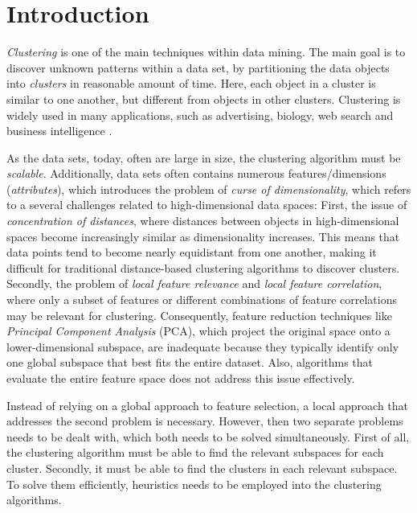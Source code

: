 \section{Introduction}
\textit{Clustering} is one of the main techniques within data mining. The main goal is to discover unknown patterns within a data set, by partitioning the data objects into \textit{clusters} in reasonable amount of time. Here, each object in a cluster is similar to one another, but different from objects in other clusters. Clustering is widely used in many applications, such as advertising, biology, web search and business intelligence \cite[p.~444]{han-2011}.

As the data sets, today, often are large in size, the clustering algorithm must be \textit{scalable}. Additionally, data sets often contains numerous features/dimensions (\textit{attributes}), which introduces the problem of \textit{curse of dimensionality}, which refers to a several challenges related to high-dimensional data spaces: First, the issue of \textit{concentration of distances}, where distances between objects in high-dimensional spaces become increasingly similar as dimensionality increases. This means that data points tend to become nearly equidistant from one another, making it difficult for traditional distance-based clustering algorithms to discover clusters. Secondly, the problem of \textit{local feature relevance} and \textit{local feature correlation}, where only a subset of features or different combinations of feature correlations may be relevant for clustering. Consequently, feature reduction techniques like \textit{Principal Component Analysis} (PCA), which project the original space onto a lower-dimensional subspace, are inadequate because they typically identify only one global subspace that best fits the entire dataset. Also, algorithms that evaluate the entire feature space does not address this issue effectively. \cite[p.~43--46]{kriegel-2009}

Instead of relying on a global approach to feature selection, a local approach that addresses the second problem is necessary. However, then two separate problems needs to be dealt with, which both needs to be solved simultaneously. First of all, the clustering algorithm must be able to find the relevant subspaces for each cluster. Secondly, it must be able to find the clusters in each relevant subspace. To solve them efficiently, heuristics needs to be employed into the clustering algorithms. \cite[p.~6--7]{kriegel-2009}

